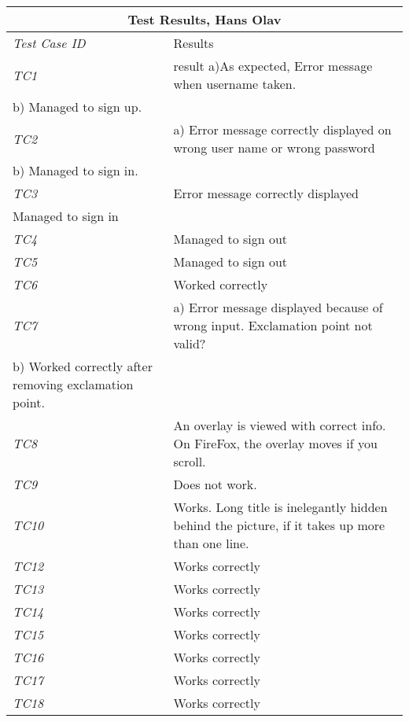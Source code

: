 %
\begin{minipage}{\linewidth}
\setlength{\tabcolsep}{15pt}
\centering
{}
\begin{tabular}{ |l|p{70mm}| }
	\hline
	\multicolumn{2}{|c|}{\cellcolor{gray!25} \textbf{Test Results, Hans Olav}} \\
	\hline
	\it{\cellcolor{gray!25}Test Case ID} & {\cellcolor{gray!25} Results } \\
	\hline
	\it{\cellcolor{gray!25}TC1} & result a)As expected, Error message when username taken. 
\\b) Managed to sign up. \\ \hline
	\it{\cellcolor{gray!25}TC2} & a) Error message correctly displayed on wrong user name or wrong password
\\b) Managed to sign in. \\ \hline
	\it{\cellcolor{gray!25}TC3} & Error message correctly displayed
\\ Managed to sign in \\ \hline
	\it{\cellcolor{gray!25}TC4} & Managed to sign out \\ \hline
	\it{\cellcolor{gray!25}TC5} & Managed to sign out \\ \hline
	\it{\cellcolor{gray!25}TC6} & Worked correctly \\ \hline
	\it{\cellcolor{gray!25}TC7} & a) Error message displayed because of wrong input. Exclamation point not valid?
\\b) Worked correctly after removing exclamation point. \\ \hline
	\it{\cellcolor{gray!25}TC8} & An overlay is viewed with correct info. On FireFox, the overlay moves if you scroll. \\ \hline
	\it{\cellcolor{gray!25}TC9} & Does not work. \\ \hline
	\it{\cellcolor{gray!25}TC10} & Works. Long title is inelegantly hidden behind the picture, if it takes up more than one line. \\ \hline
	\it{\cellcolor{gray!25}TC12} & Works correctly \\ \hline
	\it{\cellcolor{gray!25}TC13} & Works correctly \\ \hline
	\it{\cellcolor{gray!25}TC14} & Works correctly \\ \hline
	\it{\cellcolor{gray!25}TC15} & Works correctly \\ \hline
	\it{\cellcolor{gray!25}TC16} & Works correctly \\ \hline
	\it{\cellcolor{gray!25}TC17} & Works correctly \\ \hline
	\it{\cellcolor{gray!25}TC18} & Works correctly \\ \hline
	\hline
\end{tabular}
\medskip
\end{minipage}
